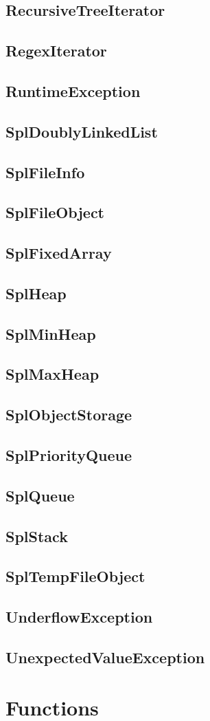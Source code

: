 \section{RecursiveTreeIterator}
\section{RegexIterator}
\section{RuntimeException}
\section{SplDoublyLinkedList}
\section{SplFileInfo}
\section{SplFileObject}
\section{SplFixedArray}
\section{SplHeap}
\section{SplMinHeap}
\section{SplMaxHeap}
\section{SplObjectStorage}
\section{SplPriorityQueue}
\section{SplQueue}
\section{SplStack}
\section{SplTempFileObject}
\section{UnderflowException}
\section{UnexpectedValueException}



\chapter{Functions}





